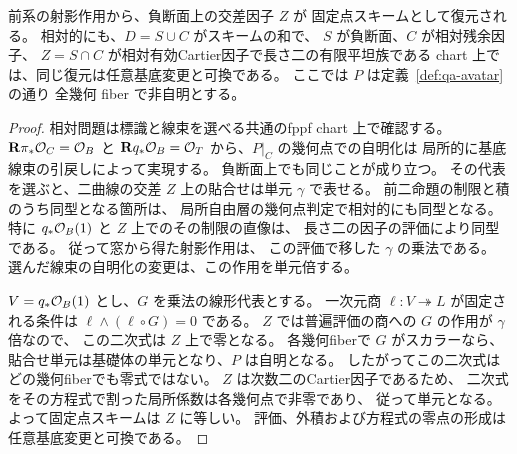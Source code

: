 \begin{corollary}[境界窓の作用の固定点スキーム]
\label{cor:qa-avatar-deep-fixed-divisor}
前系の射影作用から、負断面上の交差因子 $Z$ が
固定点スキームとして復元される。
相対的にも、$D=S\cup C$ がスキームの和で、
$S$ が負断面、$C$ が相対残余因子、
$Z=S\cap C$ が相対有効Cartier因子で長さ二の有限平坦族である
chart 上では、同じ復元は任意基底変更と可換である。
ここでは $P$ は定義~\ref{def:qa-avatar}の通り
全幾何 fiber で非自明とする。
\end{corollary}
\begin{proof}
相対問題は標識と線束を選べる共通のfppf chart 上で確認する。
$\mathbf R\pi_*\mathcal O_C=\mathcal O_B$ と
$\mathbf Rq_*\mathcal O_B=\mathcal O_T$ から、$P|_C$ の幾何点での自明化は
局所的に基底線束の引戻しによって実現する。
負断面上でも同じことが成り立つ。
その代表を選ぶと、二曲線の交差 $Z$ 上の貼合せは単元 $\gamma$ で表せる。
前二命題の制限と積のうち同型となる箇所は、
局所自由層の幾何点判定で相対的にも同型となる。
特に $q_*\mathcal O_B(1)$ と $Z$ 上でのその制限の直像は、
長さ二の因子の評価により同型である。
従って窓から得た射影作用は、
この評価で移した $\gamma$ の乗法である。
選んだ線束の自明化の変更は、この作用を単元倍する。

$V=q_*\mathcal O_B(1)$ とし、$G$ を乗法の線形代表とする。
一次元商 $\ell:V\twoheadrightarrow L$ が固定される条件は
$\ell\wedge(\ell\circ G)=0$ である。
$Z$ では普遍評価の商への $G$ の作用が $\gamma$ 倍なので、
この二次式は $Z$ 上で零となる。
各幾何fiberで $G$ がスカラーなら、
貼合せ単元は基礎体の単元となり、$P$ は自明となる。
したがってこの二次式はどの幾何fiberでも零式ではない。
$Z$ は次数二のCartier因子であるため、
二次式をその方程式で割った局所係数は各幾何点で非零であり、
従って単元となる。よって固定点スキームは $Z$ に等しい。
評価、外積および方程式の零点の形成は任意基底変更と可換である。
\end{proof}

